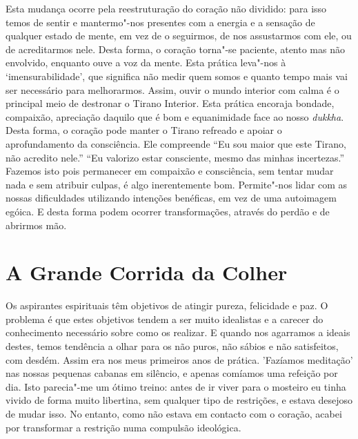 Esta mudança ocorre pela reestruturação do coração não dividido: para
isso temos de sentir e mantermo"-nos presentes com a energia e a sensação
de qualquer estado de mente, em vez de o seguirmos, de nos assustarmos com
ele, ou de acreditarmos nele. Desta forma, o coração torna"-se paciente,
atento mas não envolvido, enquanto ouve a voz da mente. Esta prática
leva"-nos à `imensurabilidade', que significa não medir quem somos e
quanto tempo mais vai ser necessário para melhorarmos. Assim, ouvir o
mundo interior com calma é o principal meio de destronar o Tirano
Interior. Esta prática encoraja bondade, compaixão, apreciação daquilo
que é bom e equanimidade face ao nosso \emph{dukkha}. Desta forma, o
coração pode manter o Tirano refreado e apoiar o aprofundamento da
consciência. Ele compreende “Eu sou maior que este Tirano, não acredito
nele.” “Eu valorizo estar consciente, mesmo das minhas incertezas.”
Fazemos isto pois permanecer em compaixão e consciência, sem tentar
mudar nada e sem atribuir culpas, é algo inerentemente bom. Permite"-nos
lidar com as nossas dificuldades utilizando intenções benéficas, em vez
de uma autoimagem egóica. E desta forma podem ocorrer transformações,
através do perdão e de abrirmos mão.

\section{A Grande Corrida da Colher}

Os aspirantes espirituais têm objetivos de atingir pureza, felicidade e
paz. O problema é que estes objetivos tendem a ser muito idealistas e a
carecer do conhecimento necessário sobre como os realizar. E quando nos
agarramos a ideais destes, temos tendência a olhar para os não puros,
não sábios e não satisfeitos, com desdém. Assim era nos meus primeiros
anos de prática. 'Fazíamos meditação' nas nossas pequenas cabanas em
silêncio, e apenas comíamos uma refeição por dia. Isto parecia"-me um
ótimo treino: antes de ir viver para o mosteiro eu tinha vivido de forma
muito libertina, sem qualquer tipo de restrições, e estava desejoso de
mudar isso. No entanto, como não estava em contacto com o coração,
acabei por transformar a restrição numa compulsão ideológica.

